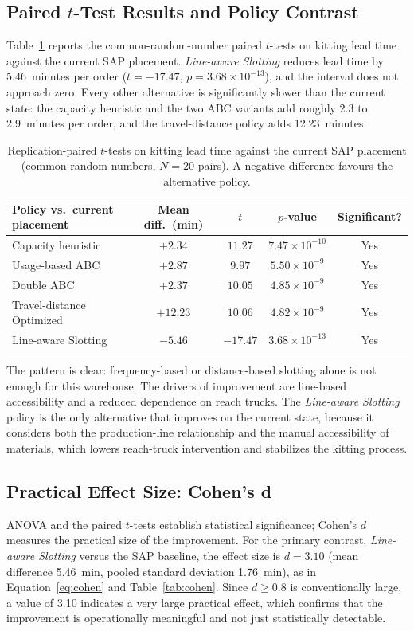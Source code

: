 \documentclass[12pt,a4paper]{article}
\newcommand{\policy}[1]{\textit{#1}}
\begin{document}
\subsection{Paired \texorpdfstring{$t$}{t}-Test Results and Policy Contrast}
\label{sec:res-paired}
Table~\ref{tab:paired} reports the common-random-number paired $t$-tests on
kitting lead time against the current SAP placement. \policy{Line-aware
Slotting} reduces lead time by 5.46~minutes per order ($t=-17.47$,
$p=3.68\times10^{-13}$), and the interval does not approach zero. Every other
alternative is significantly slower than the current state: the capacity
heuristic and the two ABC variants add roughly 2.3 to 2.9~minutes per order,
and the travel-distance policy adds 12.23~minutes.

\begin{table}[htbp]
\centering
\caption{Replication-paired $t$-tests on kitting lead time against the current
SAP placement (common random numbers, $N=20$ pairs). A negative difference
favours the alternative policy.}
\label{tab:paired}
\begin{tabular}{lcccc}
\toprule
Policy vs.\ current placement & Mean diff.\ (min) & $t$ & $p$-value & Significant? \\
\midrule
Capacity heuristic & $+2.34$ & $11.27$ & $7.47\times10^{-10}$ & Yes \\
Usage-based ABC & $+2.87$ & $9.97$ & $5.50\times10^{-9}$ & Yes \\
Double ABC & $+2.37$ & $10.05$ & $4.85\times10^{-9}$ & Yes \\
Travel-distance Optimized & $+12.23$ & $10.06$ & $4.82\times10^{-9}$ & Yes \\
Line-aware Slotting & $-5.46$ & $-17.47$ & $3.68\times10^{-13}$ & Yes \\
\bottomrule
\end{tabular}
\end{table}

The pattern is clear: frequency-based or distance-based slotting alone is not
enough for this warehouse. The drivers of improvement are line-based
accessibility and a reduced dependence on reach trucks. The
\policy{Line-aware Slotting} policy is the only alternative that improves on
the current state, because it considers both the production-line relationship
and the manual accessibility of materials, which lowers reach-truck
intervention and stabilizes the kitting process.

\subsection{Practical Effect Size: Cohen's d}
\label{sec:res-cohen}
ANOVA and the paired $t$-tests establish statistical significance; Cohen's $d$
measures the practical size of the improvement. For the primary contrast,
\policy{Line-aware Slotting} versus the SAP baseline, the effect size is
$d=3.10$ (mean difference 5.46~min, pooled standard deviation 1.76~min), as in
Equation~\eqref{eq:cohen} and Table~\ref{tab:cohen}. Since $d \ge 0.8$ is
conventionally large, a value of 3.10 indicates a very large practical effect,
which confirms that the improvement is operationally meaningful and not just
statistically detectable.
\end{document}
